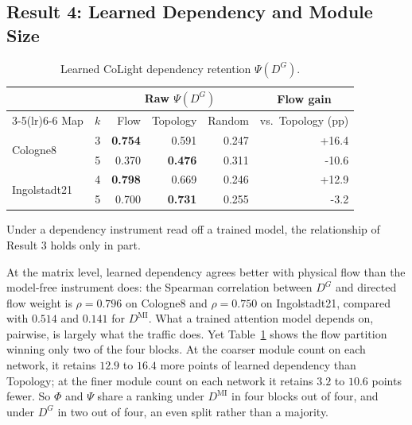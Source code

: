 \documentclass[journal]{IEEEtran}
\theoremstyle{definition}
\begin{document}
\subsection{Result 4: Learned Dependency and Module Size}
\label{sec:exp-dg}

\begin{table}[t]
    \centering
    \caption{Learned CoLight dependency retention $\Psi(D^G)$.}
    \label{tab:psi-dg}
    \footnotesize
    \begin{tabular}{lrrrrr}
        \toprule
                                      &     & \multicolumn{3}{c}{Raw $\Psi(D^G)$} & \multicolumn{1}{c}{Flow gain}                               \\
        \cmidrule(lr){3-5}\cmidrule(lr){6-6}
        Map                           & $k$ & Flow                                & Topology                      & Random & vs.\ Topology (pp) \\
        \midrule
        \multirow{2}{*}{Cologne8}     & 3   & \textbf{0.754}                      & 0.591                         & 0.247  & +16.4              \\
                                      & 5   & 0.370                               & \textbf{0.476}                & 0.311  & -10.6              \\\midrule
        \multirow{2}{*}{Ingolstadt21} & 4   & \textbf{0.798}                      & 0.669                         & 0.246  & +12.9              \\
                                      & 5   & 0.700                               & \textbf{0.731}                & 0.255  & -3.2               \\
        \bottomrule
    \end{tabular}
\end{table}

Under a dependency instrument read off a trained model, the relationship of Result 3 holds only in part.

At the matrix level, learned dependency agrees better with physical flow than the model-free instrument does: the Spearman correlation between $D^G$ and directed flow weight is $\rho=0.796$ on Cologne8 and $\rho=0.750$ on Ingolstadt21, compared with $0.514$ and $0.141$ for $D^{\mathrm{MI}}$.
What a trained attention model depends on, pairwise, is largely what the traffic does.
Yet Table~\ref{tab:psi-dg} shows the flow partition winning only two of the four blocks.
At the coarser module count on each network, it retains $12.9$ to $16.4$ more points of learned dependency than Topology; at the finer module count on each network it retains $3.2$ to $10.6$ points fewer.
So $\Phi$ and $\Psi$ share a ranking under $D^{\mathrm{MI}}$ in four blocks out of four, and under $D^G$ in two out of four, an even split rather than a majority.
\end{document}
